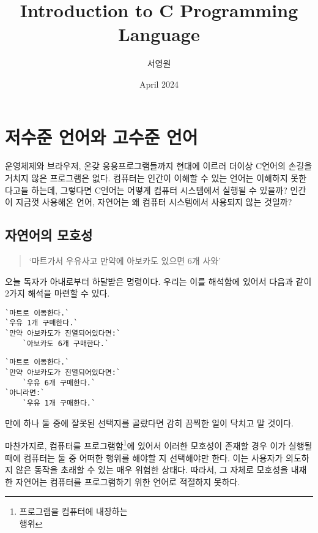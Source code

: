 \documentclass{article}
\title{Introduction to C Programming Language}
\author{서영원}
\date{April 2024}
\begin{document}
\maketitle

\tableofcontents

\vfill
\doclicenseThis


\pagebreak

\section{저수준 언어와 고수준 언어}

운영체제와 브라우저, 온갖 응용프로그램들까지 현대에 이르러 더이상
C언어의 손길을 거치지 않은 프로그램은 없다.
컴퓨터는 인간이 이해할 수 있는 언어는 이해하지 못한다고들 하는데,
그렇다면 C언어는 어떻게 컴퓨터 시스템에서 실행될 수 있을까?
인간이 지금껏 사용해온 언어, 자연어는 왜 컴퓨터 시스템에서 사용되지 않는
것일까?

\subsection{자연어의 모호성}

\begin{quote}
`마트가서 우유사고 만약에 아보카도 있으면 6개 사와'
\end{quote}

오늘 독자가 아내로부터 하달받은 명령이다.
우리는 이를 해석함에 있어서 다음과 같이 2가지 해석을 마련할 수 있다.

\begin{minipage}{0.45\textwidth}
    \begin{lstlisting}[escapeinside=``]
`마트로 이동한다.`
`우유 1개 구매한다.`
`만약 아보카도가 진열되어있다면:`
    `아보카도 6개 구매한다.`
    \end{lstlisting}
\end{minipage}
\hfill
\begin{minipage}{0.45\textwidth}
    \begin{lstlisting}[escapeinside=``]
`마트로 이동한다.`
`만약 아보카도가 진열되어있다면:`
    `우유 6개 구매한다.`
`아니라면:`
    `우유 1개 구매한다.`
    \end{lstlisting}
\end{minipage}

만에 하나 둘 중에 잘못된 선택지를 골랐다면 감히 끔찍한 일이 닥치고 말
것이다.

마찬가지로, 컴퓨터를 프로그램함\footnote{프로그램을 컴퓨터에 내장하는 \\
행위}에 있어서 이러한 모호성이 존재할 경우 이가 실행될 때에 컴퓨터는 둘
중 어떠한 행위를 해야할 지 선택해야만 한다. 이는 사용자가 의도하지 않은
동작을 초래할 수 있는 매우 위험한 상태다. 따라서, 그 자체로 모호성을
내재한 자연어는 컴퓨터를 프로그램하기 위한 언어로 적절하지 못하다.
\end{document}
